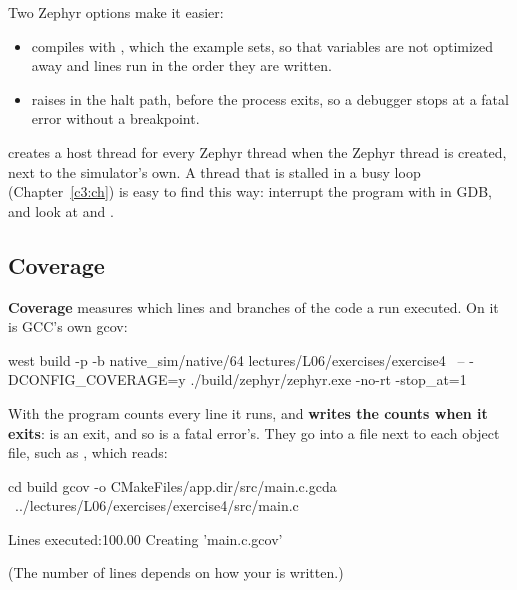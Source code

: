 Two Zephyr options make it easier:

\begin{itemize}
  \item \textbf{} compiles with , which the
     example sets, so that variables are not optimized away and
    lines run in the order they are written.
  \item \textbf{} raises  in the halt path, before the
    process exits, so a debugger stops at a fatal error without a breakpoint.
\end{itemize}

 creates a host thread for every Zephyr thread when the Zephyr thread is created,
next to the simulator’s own. A thread that is stalled in a busy loop (Chapter~\ref{c3:ch}) is easy
to find this way: interrupt the program with  in GDB, and look at 
and .

\subsection{Coverage}
\textbf{Coverage} measures which lines and branches of the code a run executed. On 
it is GCC’s own gcov:

\begin{shell}
west build -p -b native_sim/native/64 lectures/L06/exercises/exercise4 \
    -- -DCONFIG_COVERAGE=y
./build/zephyr/zephyr.exe -no-rt -stop_at=1
\end{shell}

\noindent With  the program counts every line it runs, and \textbf{writes
the counts when it exits}: \code{-stop_at} is an exit, and so is a fatal error’s. They go into a
\code{.gcda} file next to each object file, such as ,
which \code{gcov} reads:

\begin{shell}
cd build
gcov -o CMakeFiles/app.dir/src/main.c.gcda \
    ../lectures/L06/exercises/exercise4/src/main.c
\end{shell}

\begin{console}
Lines executed:100.00%
Creating 'main.c.gcov'
\end{console}

\noindent (The number of lines depends on how your  is written.)

